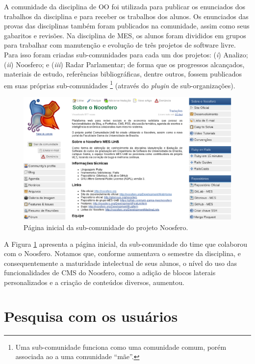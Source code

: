 A comunidade da disciplina de OO foi utilizada para  publicar os enunciados dos
trabalhos da disciplina e para receber os trabalhos dos alunos. Os enunciados
das provas das disciplinas também foram publicados na comunidade, assim como
seus gabaritos e revisões.
%
Na disciplina de MES, os alunos foram divididos em grupos para trabalhar com
manutenção e evolução de três projetos de software livre. Para isso foram
criadas sub-comunidades para cada um dos projetos:
%
(\textit{i}) Analizo;
(\textit{ii}) Noosfero;
e (\textit{iii}) Radar Parlamentar;
%
de forma que os progressos alcançados, materiais de estudo, referências
bibliográficas, dentre outros, fossem publicados em suas próprias sub-comunidades%
\footnote{Uma sub-comunidade funciona como uma comunidade comum, porém
associada ao a uma comunidade ``mãe''.} (através do \textit{plugin} de
sub-organizações).

\begin{figure}[h!]
    \centering
    \includegraphics[keepaspectratio=true,scale=0.35]
      {figuras/Noosfero-MES.eps}
    \caption{Página inicial da sub-comunidade do projeto Noosfero.}
    \label{mes-noosfero}
\end{figure}

A Figura \ref{mes-noosfero} apresenta a página inicial,  da sub-comunidade do
time que colaborou com o Noosfero. Notamos que, conforme aumentava o semestre da
disciplina, e consequentemente a maturidade intelectual de seus alunos, o nível
do uso das funcionalidades de CMS do Noosfero, como a adição de blocos
laterais personalizados e a criação de conteúdos diversos, aumentou.

\section{Pesquisa com os usuários}

